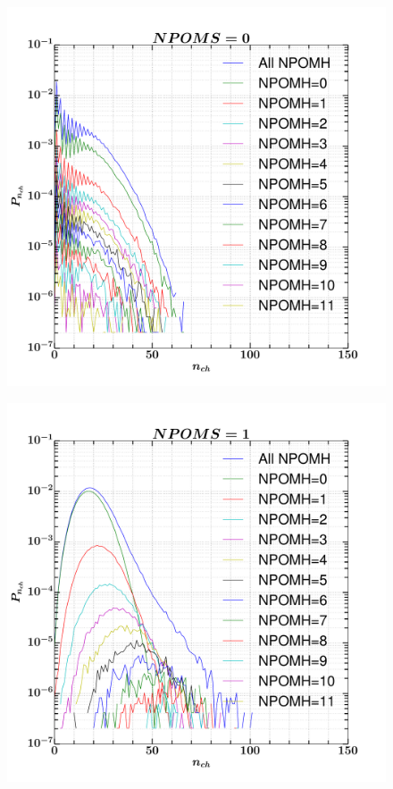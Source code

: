 \documentclass[]{article}
\begin{document}
\begin{figure}[h!]
    \centering
    \includegraphics[scale=0.5]{../analyzed/NPOMS0.pdf}
    \caption[NPOMS=0]{}
\end{figure}
\begin{figure}[h!]
    \centering
    \includegraphics[scale=0.5]{../analyzed/NPOMS1.pdf}
    \caption[NPOMS=1]{}
\end{figure}
\end{document}
